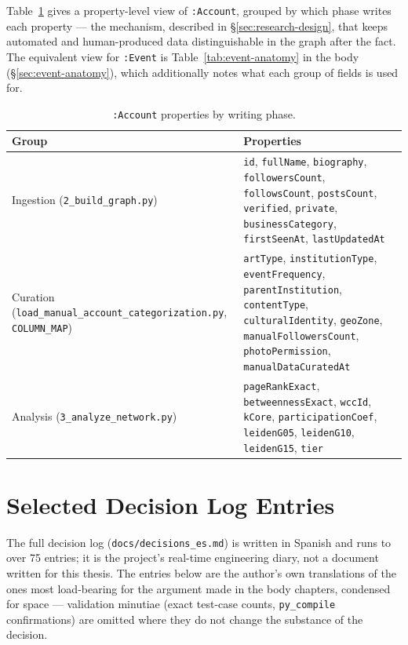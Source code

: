\documentclass[12pt, a4paper]{report}
\begin{document}
Table~\ref{tab:account-props} gives a property-level view of
\texttt{:Account}, grouped by which phase writes each property — the
mechanism, described in \S\ref{sec:research-design}, that keeps
automated and human-produced data distinguishable in the graph after the
fact. The equivalent view for \texttt{:Event} is Table~\ref{tab:event-anatomy}
in the body (\S\ref{sec:event-anatomy}), which additionally notes what
each group of fields is used for.

\begin{table}[htbp]
\centering
\caption{\texttt{:Account} properties by writing phase.}
\label{tab:account-props}
\small
\begin{tabular}{@{}p{4.6cm}p{10.4cm}@{}}
\toprule
Group & Properties \\
\midrule
Ingestion (\texttt{2\_build\_graph.py}) &
\texttt{id}, \texttt{fullName}, \texttt{biography}, \texttt{followersCount},
\texttt{followsCount}, \texttt{postsCount}, \texttt{verified},
\texttt{private}, \texttt{businessCategory}, \texttt{firstSeenAt},
\texttt{lastUpdatedAt} \\
Curation (\texttt{load\_manual\_account\_\allowbreak categorization.py},
\texttt{COLUMN\_MAP}) &
\texttt{artType}, \texttt{institutionType}, \texttt{eventFrequency},
\texttt{parentInstitution}, \texttt{contentType},
\texttt{culturalIdentity}, \texttt{geoZone},
\texttt{manualFollowersCount}, \texttt{photoPermission},
\texttt{manualDataCuratedAt} \\
Analysis (\texttt{3\_analyze\_network.py}) &
\texttt{pageRankExact}, \texttt{betweennessExact}, \texttt{wccId},
\texttt{kCore}, \texttt{participationCoef}, \texttt{leidenG05},
\texttt{leidenG10}, \texttt{leidenG15}, \texttt{tier} \\
\bottomrule
\end{tabular}
\end{table}


\chapter{Selected Decision Log Entries}
\label{app:decisions}

The full decision log (\texttt{docs/decisions\_es.md}) is written in
Spanish and runs to over 75 entries; it is the project's real-time
engineering diary, not a document written for this thesis. The entries
below are the author's own translations of the ones most load-bearing
for the argument made in the body chapters, condensed for space —
validation minutiae (exact test-case counts, \texttt{py\_compile}
confirmations) are omitted where they do not change the substance of
the decision.
\end{document}
